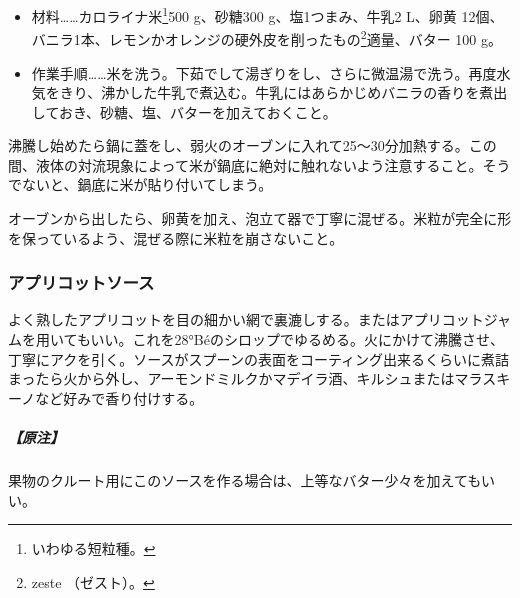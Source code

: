 \begin{Main}
\begin{itemize}
\item
  材料\ldots{}\ldots{}カロライナ米\footnote{いわゆる短粒種。}500
  g、砂糖300 g、塩1つまみ、牛乳2 L、卵黄
  12個、バニラ1本、レモンかオレンジの硬外皮を削ったもの\footnote{zeste
    （ゼスト）。}適量、バター 100 g。
\item
  作業手順\ldots{}\ldots{}米を洗う。下茹でして湯ぎりをし、さらに微温湯で洗う。再度水気をきり、沸かした牛乳で煮込む。牛乳にはあらかじめバニラの香りを煮出しておき、砂糖、塩、バターを加えておくこと。
\end{itemize}

沸騰し始めたら鍋に蓋をし、弱火のオーブンに入れて25〜30分加熱する。この間、液体の対流現象によって米が鍋底に絶対に触れないよう注意すること。そうでないと、鍋底に米が貼り付いてしまう。

オーブンから出したら、卵黄を加え、泡立て器で丁寧に混ぜる。米粒が完全に形を保っているよう、混ぜる際に米粒を崩さないこと。

\hypertarget{sauce-a-l-abricot}{%
\subsubsection{アプリコットソース}\label{sauce-a-l-abricot}}

よく熟したアプリコットを目の細かい網で裏漉しする。またはアプリコットジャムを用いてもいい。これを28°Béのシロップでゆるめる。火にかけて沸騰させ、丁寧にアクを引く。ソースがスプーンの表面をコーティング出来るくらいに煮詰まったら火から外し、アーモンドミルクかマデイラ酒、キルシュまたはマラスキーノなど好みで香り付けする。

\hypertarget{ux539fux6ce8-3}{%
\subparagraph{【原注】}\label{ux539fux6ce8-3}}

果物のクルート用にこのソースを作る場合は、上等なバター少々を加えてもいい。
\end{Main}